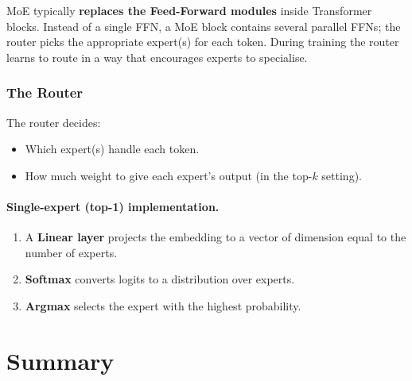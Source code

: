 \documentclass[11pt,a4paper]{article}
\theoremstyle{definition}
\theoremstyle{plain}
\theoremstyle{remark}
\begin{document}
MoE typically \textbf{replaces the Feed-Forward modules} inside Transformer blocks. Instead of a single FFN, a MoE block contains several parallel FFNs; the router picks the appropriate expert(s) for each token. During training the router learns to route in a way that encourages experts to specialise.

\subsubsection{The Router}

The router decides:
\begin{itemize}
    \item Which expert(s) handle each token.
    \item How much weight to give each expert's output (in the top-$k$ setting).
\end{itemize}

\paragraph{Single-expert (top-1) implementation.}
\begin{enumerate}
    \item A \textbf{Linear layer} projects the embedding to a vector of dimension equal to the number of experts.
    \item \textbf{Softmax} converts logits to a distribution over experts.
    \item \textbf{Argmax} selects the expert with the highest probability.
\end{enumerate}


\section{Summary}
\end{document}
